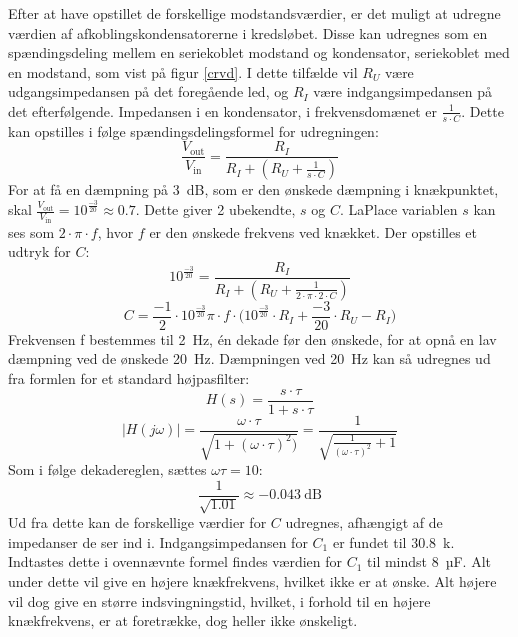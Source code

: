 Efter at have opstillet de forskellige modstandsværdier, er det muligt at udregne værdien af afkoblingskondensatorerne i kredsløbet. Disse kan udregnes som en spændingsdeling mellem en seriekoblet modstand og kondensator, seriekoblet med en modstand, som vist på figur \ref{crvd}. I dette tilfælde vil $R_U$ være udgangsimpedansen på det foregående led, og $R_I$ være indgangsimpedansen på det efterfølgende. Impedansen i en kondensator, i frekvensdomænet er $\frac{1}{s\cdot C}$. Dette kan opstilles i følge spændingsdelingsformel for udregningen:
\begin{equation}
\frac{V_{\mathrm{out}}}{V_{\mathrm{in}}}=\frac{R_I}{R_I+(R_U+\frac{1}{s\cdot C})}
\end{equation}
For at få en dæmpning på 3~dB, som er den ønskede dæmpning i knækpunktet, skal $\frac{V_{\mathrm{out}}}{V_{\mathrm{in}}}=10^{\frac{-3}{20}}\approx0.7$. 
Dette giver 2 ubekendte, $s$ og $C$. LaPlace variablen $s$ kan ses som $2\cdot \pi \cdot f$, hvor $f$ er den ønskede frekvens ved knækket. Der opstilles et udtryk for $C$:
\begin{equation}
10^{\frac{-3}{20}}=\frac{R_I}{R_I+(R_U+\frac{1}{2\cdot\pi\cdot 2\cdot C})}
\end{equation}
\begin{equation}
C=\frac{-1}{2}\cdot{10^{\frac{-3}{20}}}{\pi\cdot f\cdot(10^{\frac{-3}{20}}\cdot R_I+\frac{-3}{20}}\cdot R_U - R_I)
\end{equation}
Frekvensen f bestemmes til 2~Hz, én dekade før den ønskede, for at opnå en lav dæmpning ved de ønskede 20~Hz. Dæmpningen ved 20~Hz kan så udregnes ud fra formlen for et standard højpasfilter:
\begin{equation}
H(s)=\frac{s\cdot\tau}{1+s\cdot\tau}
\end{equation}
\begin{equation}
|H(j\omega)|=\frac{\omega\cdot\tau}{\sqrt{1+(\omega\cdot\tau)^2)}}=\frac{1}{\sqrt{\frac{1}{(\omega\cdot\tau)^2}+1}}
\end{equation}
Som i følge dekadereglen, sættes $\omega\tau = 10$:
\begin{equation}
\frac{1}{\sqrt{1.01}}\approx -0.043~\mathrm{dB}
\end{equation}
Ud fra dette kan de forskellige værdier for $C$ udregnes, afhængigt af de impedanser de ser ind i.
Indgangsimpedansen for $C_1$ er fundet til 30.8~k\ohm . Indtastes dette i ovennævnte formel findes værdien for $C_1$ til mindst 8~µF. Alt under dette vil give en højere knækfrekvens, hvilket ikke er at ønske. Alt højere vil dog give en større indsvingningstid, hvilket, i forhold til en højere knækfrekvens, er at foretrække, dog heller ikke ønskeligt.
